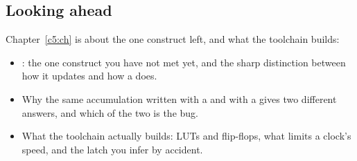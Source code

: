 \subsection*{Looking ahead}
Chapter~\ref{c5:ch} is about the one construct left, and what the toolchain builds:
\begin{itemize}
  \item {}: the one construct you have not met yet, and the sharp distinction between
    how it updates and how a  does.
  \item Why the same accumulation written with a  and with a  gives two
    different answers, and which of the two is the bug.
  \item What the toolchain actually builds: LUTs and flip-flops, what limits a clock's speed, and
    the latch you infer by accident.
\end{itemize}

